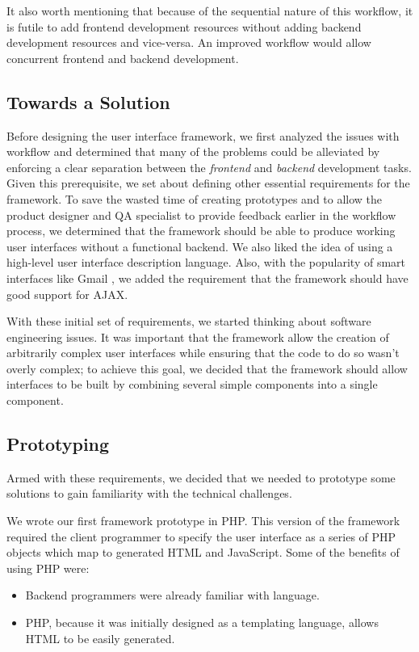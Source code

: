 \documentclass[10pt, twocolumn]{article}
\begin{document}
It also worth mentioning that because of the sequential nature of
this workflow, it is futile to add frontend development resources
without adding backend development resources and vice-versa. An
improved workflow would allow concurrent frontend and backend
development.

\subsection{Towards a Solution}

Before designing the user interface framework, we first analyzed
the issues with workflow and determined that many of the problems
could be alleviated by enforcing a clear separation between the
\emph{frontend} and \emph{backend} development tasks. Given this
prerequisite, we set about defining other essential requirements
for the framework. To save the wasted time of creating prototypes
and to allow the product designer and QA specialist to provide
feedback earlier in the workflow process, we determined that the
framework should be able to produce working user interfaces
without a functional backend. We also liked the idea of using a
high-level user interface description language. Also, with the
popularity of smart interfaces like Gmail \cite{gmail}, we added
the requirement that the framework should have good support for
AJAX.

With these initial set of requirements, we started thinking about
software engineering issues. It was important that the framework
allow the creation of arbitrarily complex user interfaces while
ensuring that the code to do so wasn't overly complex; to achieve
this goal, we decided that the framework should allow interfaces
to be built by combining several simple components into a single
component.

\subsection{Prototyping}

Armed with these requirements, we decided that we needed to
prototype some solutions to gain familiarity with the technical
challenges.

We wrote our first framework prototype in PHP. This version of the
framework required the client programmer to specify the user
interface as a series of PHP objects which map to generated HTML
and JavaScript. Some of the benefits of using PHP were:

\begin{itemize}
\item Backend programmers were already familiar with language.
\item PHP, because it was initially designed as a templating
  language, allows HTML to be easily generated.
\end{itemize}
\end{document}
